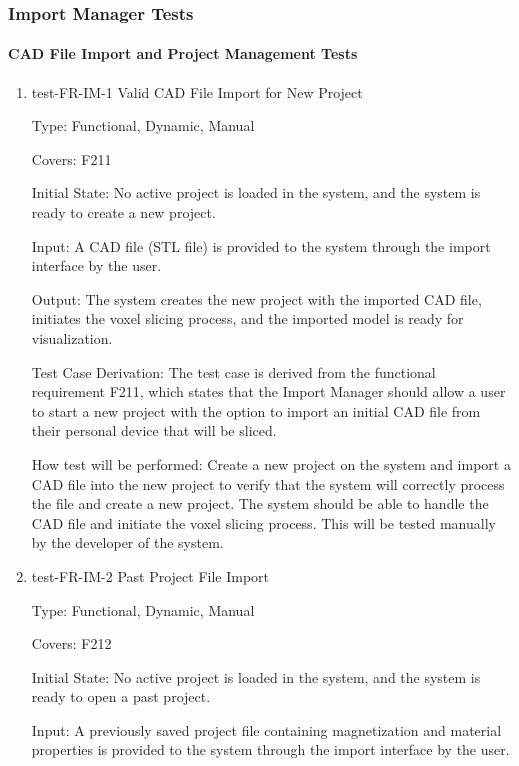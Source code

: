 \documentclass[12pt, titlepage]{article}
\begin{document}
\subsubsection{Import Manager Tests}

\paragraph{CAD File Import and Project Management Tests}

\begin{enumerate}

\item{test-FR-IM-1 Valid CAD File Import for New Project\\}

Type: Functional, Dynamic, Manual

Covers: F211
					
Initial State: No active project is loaded in the system, and the system is ready to create a new project.
					
Input: A CAD file (STL file) is provided to the system through the import interface by the user.
					
Output: The system creates the new project with the imported CAD file, initiates the voxel slicing process, and the imported model is ready for visualization.

Test Case Derivation: The test case is derived from the functional requirement F211, which states that the Import Manager should allow a user to start a new project with the option to import an initial CAD file from their personal device that will be sliced.
					
How test will be performed: Create a new project on the system and import a CAD file into the new project to verify that the system will correctly process the file and create a new project. The system should be able to handle the CAD file and initiate the voxel slicing process. This will be tested manually by the developer of the system.

\item{test-FR-IM-2 Past Project File Import\\}

Type: Functional, Dynamic, Manual

Covers: F212
					
Initial State: No active project is loaded in the system, and the system is ready to open a past project.
					
Input: A previously saved project file containing magnetization and material properties is provided to the system through the import interface by the user.
					

\end{enumerate}
\end{document}
